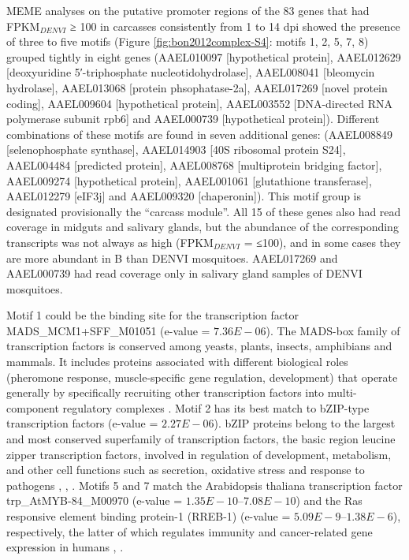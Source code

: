 MEME analyses on the putative promoter regions of the 83 genes that had FPKM$_{DENVI}$ ≥ 100 in carcasses consistently from 1 to 14 \gls{dpi} showed the presence of three to five motifs (Figure \ref{fig:bon2012complex-S4}: motifs 1, 2, 5, 7, 8) grouped tightly in eight genes (AAEL010097 [hypothetical protein], AAEL012629 [deoxyuridine 5′-triphosphate nucleotidohydrolase], AAEL008041 [bleomycin hydrolase], AAEL013068 [protein phsophatase-2a], AAEL017269 [novel protein coding], AAEL009604 [hypothetical protein], AAEL003552 [DNA-directed RNA polymerase subunit rpb6] and AAEL000739 [hypothetical protein]).
Different combinations of these motifs are found in seven additional genes: (AAEL008849 [selenophosphate synthase], AAEL014903 [40S ribosomal protein S24], AAEL004484 [predicted protein], AAEL008768 [multiprotein bridging factor], AAEL009274 [hypothetical protein], AAEL001061 [glutathione transferase], AAEL012279 [eIF3j] and AAEL009320 [chaperonin]).
This motif group is designated provisionally the “carcass module”.
All 15 of these genes also had read coverage in midguts and salivary glands, but the abundance of the corresponding transcripts was not always as high (FPKM$_{DENVI}$ = ≤100), and in some cases they are more abundant in B than \gls{DENVI} mosquitoes.
AAEL017269 and AAEL000739 had read coverage only in salivary gland samples of \gls{DENVI} mosquitoes.

Motif 1 could be the binding site for the transcription factor MADS\_MCM1+SFF\_M01051 (e-value = $7.36E-06$).
The MADS-box family of transcription factors is conserved among yeasts, plants, insects, amphibians and mammals.
It includes proteins associated with different biological roles (pheromone response, muscle-specific gene regulation, development) that operate generally by specifically recruiting other transcription factors into multi-component regulatory complexes \cite{Shore1995}.
Motif 2 has its best match to bZIP-type transcription factors (e-value = $2.27E-06$).
bZIP proteins belong to the largest and most conserved superfamily of transcription factors, the basic region leucine zipper transcription factors, involved in regulation of development, metabolism, and other cell functions such as secretion, oxidative stress and response to pathogens \cite{Miller2009}, \cite{Abrams2005}, \cite{Guo2010a}.
Motifs 5 and 7 match the Arabidopsis thaliana transcription factor trp\_AtMYB-84\_M00970 (e-value = $1.35E-10$–$7.08E-10$) and the Ras responsive element binding protein-1 (RREB-1) (e-value = $5.09E-9$–$1.38E-6$), respectively, the latter of which regulates immunity and cancer-related gene expression in humans \cite{Flajollet2009}, \cite{Liu2009}.

